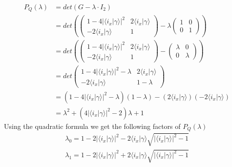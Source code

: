 \begin{align}
P_Q(\lambda) &= det(G - \lambda\cdot I_2)\\
		&= det\left(
			\begin{pmatrix}
1-4\left\vert\langle i_{x} \vert \gamma \rangle\right\vert^{2} & 2\langle i_{x} \vert \gamma \rangle\\
-2\langle i_{x} \vert \gamma \rangle & 1
\end{pmatrix}
			-
			\lambda
			\begin{pmatrix}
1 & 0\\
0 & 1
\end{pmatrix}
		 \right)\\
		 &= det\left(
			\begin{pmatrix}
1-4\left\vert\langle i_{x} \vert \gamma \rangle\right\vert^{2} & 2\langle i_{x} \vert \gamma \rangle\\
-2\langle i_{x} \vert \gamma \rangle & 1
\end{pmatrix}
			-
			\begin{pmatrix}
\lambda & 0\\
0 & \lambda
\end{pmatrix}
		 \right)\\
		 &= det\begin{pmatrix}
1-4\left\vert\langle i_{x} \vert \gamma \rangle\right\vert^{2} - \lambda & 2\langle i_{x} \vert \gamma \rangle\\
-2\langle i_{x} \vert \gamma \rangle & 1 - \lambda
\end{pmatrix}\\
&= \left( 1-4\left\vert\langle i_{x} \vert \gamma \rangle\right\vert^{2} - \lambda \right)\left( 1 - \lambda \right) - \left( 2\langle i_{x} \vert \gamma \rangle \right)\left( -2\langle i_{x} \vert \gamma \rangle \right)\\
&= \lambda^2 + (4\left\vert \langle i_{x} \vert \gamma \rangle \right\vert^2 - 2)\lambda + 1
\end{align}
Using the quadratic formula we get the following factors of $P_Q(\lambda)$
\begin{align}
	\lambda_0 = 1 - 2\left\vert\langle i_{x} \vert \gamma \rangle\right\vert^{2} - 2\langle i_{x} \vert \gamma \rangle\sqrt{\left\vert\langle i_{x} \vert \gamma \rangle\right\vert^{2} - 1}\\
	\lambda_1 = 1 - 2\left\vert\langle i_{x} \vert \gamma \rangle\right\vert^{2} + 2\langle i_{x} \vert \gamma \rangle\sqrt{\left\vert\langle i_{x} \vert \gamma \rangle\right\vert^{2} - 1}
\end{align}
